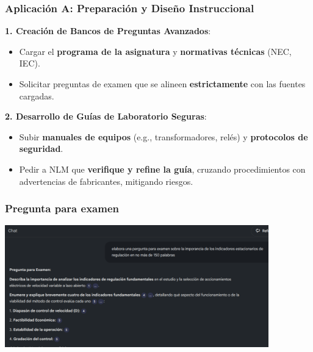\documentclass[aspectratio=43]{beamer}
\begin{document}



\begin{frame}
\frametitle{Aplicación A: Preparación y Diseño Instruccional}

\textbf{1. Creación de Bancos de Preguntas Avanzados}:
\begin{itemize}
    \item Cargar el \textbf{programa de la asignatura} y \textbf{normativas técnicas} (NEC, IEC).
    \item Solicitar preguntas de examen que se alineen \textbf{estrictamente} con las fuentes cargadas.
\end{itemize}

\textbf{2. Desarrollo de Guías de Laboratorio Seguras}:
\begin{itemize}
    \item Subir \textbf{manuales de equipos} (e.g., transformadores, relés) y \textbf{protocolos de seguridad}.
    \item Pedir a NLM que \textbf{verifique y refine la guía}, cruzando procedimientos con advertencias de fabricantes, mitigando riesgos.
\end{itemize}
\end{frame}

\begin{frame}
  \frametitle{Pregunta para examen}
  \begin{center}
    \includegraphics[width=4.5in]{pregunta.png}
  \end{center}
\end{frame}
\end{document}
